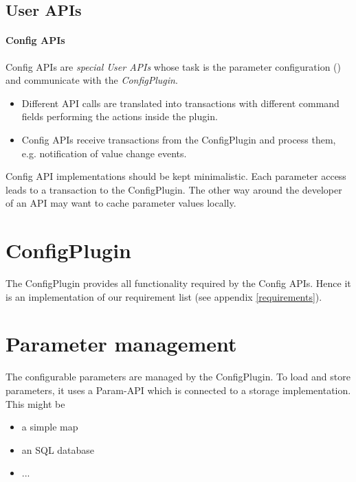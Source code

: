 \subsection{User APIs}

\paragraph{Config APIs}
Config APIs are \emph{special User APIs} whose task is the parameter configuration (\GreenConfig) and communicate with the \emph{ConfigPlugin}. 

\begin{itemize}
	\item Different API calls are translated into transactions with different command fields performing the actions inside the plugin.
	\item Config APIs receive transactions from the ConfigPlugin and process them, e.g. notification of value change events.
\end{itemize}

Config API implementations should be kept minimalistic. Each parameter access leads to a transaction to the ConfigPlugin. The other way around the developer of an API may want to cache parameter values locally.


\section{ConfigPlugin}
The ConfigPlugin provides all functionality required by the Config APIs. Hence it is an implementation of our requirement list (see appendix \ref{requirements}).


\section{Parameter management}
The configurable parameters are managed by the ConfigPlugin. To load and store parameters, it uses a Param-API which is connected to a storage implementation. This might be  

\begin{itemize}
	\item a simple map  
	\item an SQL database 
	\item ... 
\end{itemize}
